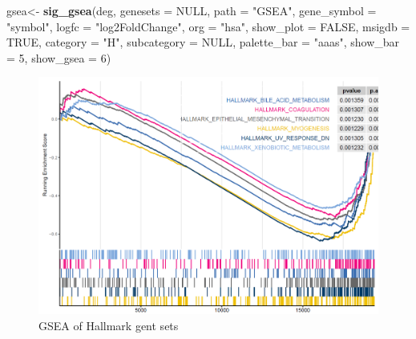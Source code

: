 \documentclass[
  12pt,
]{book}
\newenvironment{Shaded}{\begin{snugshade}}{\end{snugshade}}
\newcommand{\AttributeTok}[1]{\textcolor[rgb]{0.13,0.29,0.53}{#1}}
\newcommand{\ConstantTok}[1]{\textcolor[rgb]{0.56,0.35,0.01}{#1}}
\newcommand{\DecValTok}[1]{\textcolor[rgb]{0.00,0.00,0.81}{#1}}
\newcommand{\FunctionTok}[1]{\textcolor[rgb]{0.13,0.29,0.53}{\textbf{#1}}}
\newcommand{\NormalTok}[1]{#1}
\newcommand{\OtherTok}[1]{\textcolor[rgb]{0.56,0.35,0.01}{#1}}
\newcommand{\StringTok}[1]{\textcolor[rgb]{0.31,0.60,0.02}{#1}}
\begin{document}
\begin{Shaded}
\begin{Highlighting}[]
\NormalTok{gsea}\OtherTok{\textless{}{-}}     \FunctionTok{sig\_gsea}\NormalTok{(deg,}
                    \AttributeTok{genesets          =} \ConstantTok{NULL}\NormalTok{,}
                    \AttributeTok{path              =} \StringTok{"GSEA"}\NormalTok{,}
                    \AttributeTok{gene\_symbol       =} \StringTok{"symbol"}\NormalTok{,}
                    \AttributeTok{logfc             =} \StringTok{"log2FoldChange"}\NormalTok{,}
                    \AttributeTok{org               =} \StringTok{"hsa"}\NormalTok{,}
                    \AttributeTok{show\_plot         =} \ConstantTok{FALSE}\NormalTok{,}
                    \AttributeTok{msigdb            =} \ConstantTok{TRUE}\NormalTok{,}
                    \AttributeTok{category          =} \StringTok{"H"}\NormalTok{,}
                    \AttributeTok{subcategory       =} \ConstantTok{NULL}\NormalTok{,}
                    \AttributeTok{palette\_bar       =} \StringTok{"aaas"}\NormalTok{,}
                    \AttributeTok{show\_bar          =} \DecValTok{5}\NormalTok{,}
                    \AttributeTok{show\_gsea         =} \DecValTok{6}\NormalTok{)}
\end{Highlighting}
\end{Shaded}

\begin{figure}

{\centering \includegraphics[width=0.95\linewidth]{./fig/gsea-2} 

}

\caption{GSEA of Hallmark gent sets}\label{fig:unnamed-chunk-11}
\end{figure}
\end{document}
